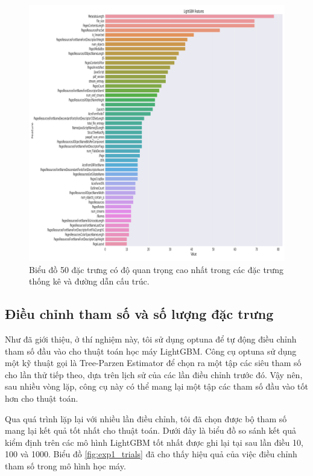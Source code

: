 \documentclass[./../main.tex]{subfiles}
\begin{document}
\begin{figure}[H]
	\centering
	\includegraphics[width=\linewidth]{./images/lgbm_importances-01.png}
	\caption{Biểu đồ 50 đặc trưng có độ quan trọng cao nhất trong các đặc trưng thống kê và đường dẫn cấu trúc.}
	\label{fig:lgbm_importances}
\end{figure}

\subsection{Điều chỉnh tham số và số lượng đặc trưng}

Như đã giới thiệu, ở thí nghiệm này, tôi sử dụng optuna để tự động điều chỉnh tham số đầu vào cho thuật toán học máy LightGBM. Công cụ optuna sử dụng một kỹ thuật gọi là Tree-Parzen Estimator \cite{optuna} để chọn ra một tập các siêu tham số cho lần thử tiếp theo, dựa trên lịch sử của các lần điều chỉnh trước đó. Vậy nên, sau nhiều vòng lặp, công cụ này có thể mang lại một tập các tham số đầu vào tốt hơn cho thuật toán.

Qua quá trình lặp lại với nhiều lần điều chỉnh, tôi đã chọn được bộ tham số mang lại kết quả tốt nhất cho thuật toán. Dưới đây là biểu đồ so sánh kết quả kiểm định trên các mô hình LightGBM tốt nhất được ghi lại tại sau lần điều 10, 100 và 1000. Biểu đồ \ref{fig:exp1_trials} đã cho thấy hiệu quả của việc điều chỉnh tham số trong mô hình học máy.
\end{document}
